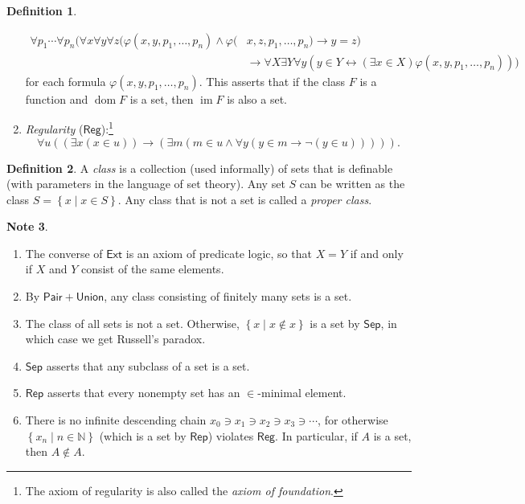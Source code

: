 \documentclass[10pt,letterpaper,cm]{nupset}
\theoremstyle{definition}
\newtheorem{definition}{Definition}[subsection]
\newtheorem{note}[definition]{Note}
\theoremstyle{theorem}
\theoremstyle{remark}
\newcommand{\N}{\mathbb N}
\newcommand{\1}{\mathbf{1}}
\newcommand{\0}{\vec 0}
\DeclareMathOperator{\im}{im}
\DeclareMathOperator{\dom}{dom}
\begin{document}
\begin{definition}
\begin{enumerate}
\[
\begin{aligned} \forall p_1 \cdots \forall p_n( \forall x \forall y \forall z(\varphi(x, y, p_1, \ldots, p_n) \wedge \varphi(&x, z, p_1, \ldots, p_n ) \rightarrow y=z ) \\ & \rightarrow \forall X \exists Y \forall y(y \in Y \leftrightarrow(\exists x \in X) \varphi(x, y, p_1, \ldots, p_n)) ) \end{aligned}
\] for each formula $\varphi(x, y, p_1, \ldots, p_n)$.
This asserts that if the class $F$ is a function and $\dom{F}$ is a set, then $\im{F}$ is also a set. 
\item \textit{Regularity}  ($\mathsf{Reg}$):\footnote{The axiom of regularity is also called the \textit{axiom of foundation}. }
\[
\forall u ((\exists x (x\in u)) \rightarrow (\exists m(m\in u \land \forall y(y\in m \rightarrow \neg(y \in u))))).
\]
\end{enumerate}
\end{definition}
 
\begin{definition}
 A \textit{class} is a collection (used informally) of sets that is definable (with parameters in the language of set theory).  Any set $S$ can be written as the class $S = \left\{x \mid x \in S\right\}$. Any class that is not a set is called a \textit{proper class}.
\end{definition} 
 
 \begin{note} $ $
\begin{enumerate}
\item The converse of $\mathsf{Ext}$ is an axiom of predicate logic, so that $X= Y$ if and only if $X$ and $Y$ consist of the same elements.
\item By $\mathsf{Pair} + \mathsf{Union}$, any class consisting of finitely many sets is a set.
\item The class of all sets is not a set. Otherwise, $\left\{x \mid x \notin x\right\}$ is a set by $\mathsf{Sep}$, in which case we get Russell's paradox. 
\item $\mathsf{Sep}$ asserts that any subclass of a set is a set.
\item $\mathsf{Rep}$ asserts that every nonempty set has an $\in$-minimal element.
\item There is no infinite descending chain $x_0 \ni x_1 \ni x_2 \ni x_3 \ni \cdots $, for otherwise $\left\{x_n \mid n \in \N\right\}$ (which is a set by $\mathsf{Rep}$) violates $\mathsf{Reg}$. In particular, if $A$ is a set, then $A\notin A$.
\end{enumerate} 
\end{note}
 
\end{document}
